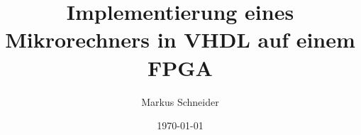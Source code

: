 \title{Implementierung eines Mikrorechners in VHDL auf einem FPGA}
\date{\today}
\author{Markus Schneider}

\maketitle
